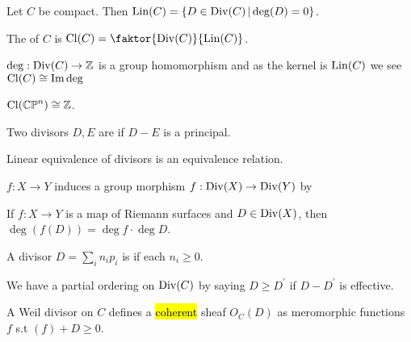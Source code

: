 \documentclass{article}
\begin{document}
\begin{prop}
	Let $C$ be compact. Then $\operatorname{Lin}(C) = \left\{ D \in \operatorname{Div}(C) \, | \deg(D) = 0 \right\}$. 
\end{prop}

\begin{definition}
	The  of $C$ is $\Cl(C) = \faktor{\Div(C)}{\Lin(C)}$.
\end{definition}

\begin{remark}
	$\deg: \operatorname{Div}(C) \to \mathbb{Z}$ is a group homomorphism and as the kernel is $\operatorname{Lin}(C)$ we see $\operatorname{Cl}(C) \cong \operatorname{Im} \deg$
\end{remark}
\begin{corollary}
	$\operatorname{Cl}(\mathbb{CP}^n) \cong \mathbb{Z}$. 
\end{corollary}

\begin{definition}
	Two divisors $D,E$ are  if $D-E$ is a principal.
\end{definition}

\begin{lemma}
	Linear equivalence of divisors is an equivalence relation. 
\end{lemma}

\begin{lemma}
	$f:X \to Y$ induces a group morphism $f:\operatorname{Div}(X) \to \operatorname{Div}(Y)$ by 
\end{lemma}

\begin{prop}
	If $f:X \to Y$ is a map of Riemann surfaces and $D \in \operatorname{Div}(X)$, then $\deg(f(D)) = \deg f \cdot \deg D$.
\end{prop}

\begin{definition}
	A divisor $D = \sum_i n_i p_i$ is  if each $n_i \geq0$.  
\end{definition}

\begin{prop}
	We have a partial ordering on $\operatorname{Div}(C)$ by saying $D\geq D^\prime$ if $D-D^\prime$ is effective. 
\end{prop}

\begin{definition}
	A Weil divisor on $C$ defines a \hl{coherent} sheaf $O_C(D)$ as meromorphic functions $f$ s.t $(f)+D\geq0$. 
\end{definition}

\end{document}

